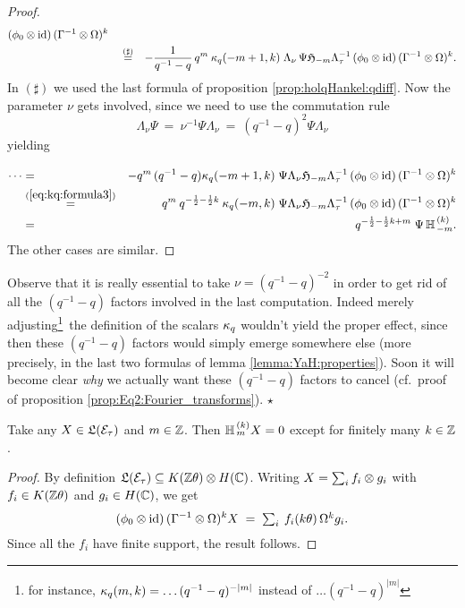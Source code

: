 \begin{proof}
\begin{eqnarray*}
         (\phi_0 \otimes \mbox{\rm id})\,(\Gamma^{-1} \otimes \Omega)^k
\\
&\hspace{1em}\stackrel{(\sharp)}{=}&
       -\frac{1}{q^{-1}-q} \,q^m\: \kappa_q(-m+1,k) \;
       \Lambda_\nu \, \Psi \mathfrak{H}_{-m} \Lambda_\tau^{-1}\,
       (\phi_0 \otimes \mbox{\rm id})\,(\Gamma^{-1} \otimes \Omega)^k.
\end{eqnarray*}
In $(\sharp)$ we used the last formula of proposition
\ref{prop:holqHankel:qdiff}\@. Now the parameter $\nu$ gets
involved, since we need to use the commutation rule
$$ \Lambda_\nu \Psi \:=\: \nu^{-1} \Psi \Lambda_\nu  \:=\: (q^{-1}-q)^2 \Psi \Lambda_\nu $$
yielding
\begin{eqnarray*}
\cdots &=\vertXL&
      -q^m \,(q^{-1}-q) \kq(-m+1,k) \; \Psi \Lambda_\nu \holH{-m} \Lambda_\tau^{-1}\,
      (\evzero \tens \id)\,(\Gamma^{-1} \tens \Omega)^k
\\
&\stackrel{(\ref{eq:kq:formula3})}{=}&
      q^m \: q^{-\frac{1}{2} -\frac{1}{2}k}\: \kq(-m,k) \;
      \Psi \Lambda_\nu \holH{-m} \Lambda_\tau^{-1}\,
      (\evzero \tens \id)\,(\Gamma^{-1} \tens \Omega)^k
\\&=&
      q^{-\frac{1}{2} -\frac{1}{2}k + m} \; \Psi \, \YaH{-m}{k}.
\end{eqnarray*}
The other cases are similar.
\end{proof}




\begin{remark} \rm
Observe that it is really essential to take $\nu=(q^{-1}-q)^{-2}$
in order to get rid of all the $(q^{-1}-q)$ factors involved in
the last computation. Indeed merely adjusting\footnote{for
instance, $\kappa_q(m,k)=\ldots (q^{-1}-q)^{-|m|}$ instead of $\ldots
(q^{-1}-q)^{|m|}$}\ the definition of the scalars $\kappa_q$ wouldn't
yield the proper effect, since then these $(q^{-1}-q)$ factors
would simply emerge somewhere else (more precisely, in the last
two formulas of lemma \ref{lemma:YaH:properties}). Soon it will
become clear {\em why\/} we actually want these $(q^{-1}-q)$
factors to cancel (cf.\ proof of proposition
\ref{prop:Eq2:Fourier_transforms}). \hfill $\star$
\end{remark}



\begin{lemma} \label{lemma:finite_support}
Take any\/ $X\in \mathfrak{L}(\mathcal E_\tau)$ and\/ $m\in \mathbb{Z}$.
Then\/ $\mathbb{H}_{\,m}^{\,(k)} X = 0$ except for finitely many\/ $k\in\mathbb{Z}$.
\end{lemma}
\begin{proof}
By definition $\mathfrak{L}(\mathcal E_\tau) \subseteq K(\mathbb{Z} \theta) \otimes H(\mathbb{C})$.
Writing $X=\sum_i f_i \otimes g_i$ with $f_i \in K(\mathbb{Z} \theta)$ and $g_i\in H(\mathbb{C})$, we get
$$ (\phi_0 \otimes \mbox{\rm id})\,(\Gamma^{-1} \otimes \Omega)^k X
       \;=\; \textstyle \sum_i\:  f_i(k\theta) \, \Omega^k  g_i.   $$
Since all the $f_i$ have finite support, the result follows.
\end{proof}



